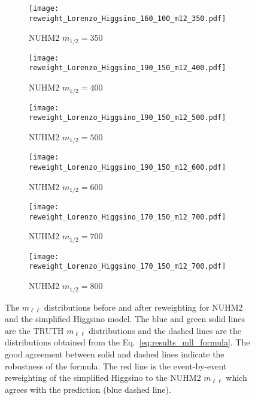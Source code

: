 \begin{figure}[htbp]
    \begin{center}
        \begin{subfigure}[b]{0.48\textwidth}
            \texttt{[image: reweight\_Lorenzo\_Higgsino\_160\_100\_m12\_350.pdf]}
            \caption{NUHM2 $m_{1/2}=350$~{\GeV}}
        \end{subfigure}
        \begin{subfigure}[b]{0.48\textwidth}
            \texttt{[image: reweight\_Lorenzo\_Higgsino\_190\_150\_m12\_400.pdf]}
            \caption{NUHM2 $m_{1/2}=400$~{\GeV}}
        \end{subfigure}
        \begin{subfigure}[b]{0.48\textwidth}
            \texttt{[image: reweight\_Lorenzo\_Higgsino\_190\_150\_m12\_500.pdf]}
            \caption{NUHM2 $m_{1/2}=500$~{\GeV}}
        \end{subfigure}
        \begin{subfigure}[b]{0.48\textwidth}
            \texttt{[image: reweight\_Lorenzo\_Higgsino\_190\_150\_m12\_600.pdf]}
            \caption{NUHM2 $m_{1/2}=600$~{\GeV}}
        \end{subfigure}
        \begin{subfigure}[b]{0.48\textwidth}
            \texttt{[image: reweight\_Lorenzo\_Higgsino\_170\_150\_m12\_700.pdf]}
            \caption{NUHM2 $m_{1/2}=700$~{\GeV}}
        \end{subfigure}
        \begin{subfigure}[b]{0.48\textwidth}
            \texttt{[image: reweight\_Lorenzo\_Higgsino\_170\_150\_m12\_700.pdf]}
            \caption{NUHM2 $m_{1/2}=800$~{\GeV}}
        \end{subfigure}
    \end{center}
    \caption{
    {\small The $m_{\ell \ell}$ distributions before and after reweighting for NUHM2 and the simplified Higgsino model.
    The blue and green solid lines are the TRUTH $m_{\ell \ell}$ distributions and the dashed lines are the distributions obtained from the Eq.~\ref{eq:results_mll_formula}.
    The good agreement between solid and dashed lines indicate the robustness of the formula.
    The red line is the event-by-event reweighting of the simplified Higgsino to the NUHM2 $m_{\ell \ell}$ which agrees with the prediction (blue dashed line).}
    }
    \label{fig:results_nuhm2_reweighting}
\end{figure}


